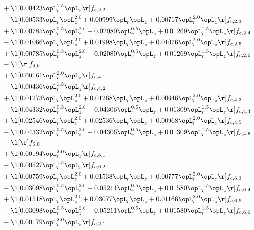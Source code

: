 \begin{alignat}{2}
& + \l[  0.00423 \opL_r^{1.5} \opL_z  \r] f_{c,2,2} \nonumber \\ 
& - \l[  0.00533 \opL_r \opL_z^{2.0} +  0.00999 \opL_r \opL_z +  0.00717 \opL_r^{2.0} \opL_z  \r] f_{c,2,3} \nonumber \\ 
& + \l[  0.00785 \opL_r^{0.5} \opL_z^{2.0} +  0.02080 \opL_r^{0.5} \opL_z +  0.01269 \opL_r^{1.5} \opL_z  \r] f_{c,2,4} \nonumber \\ 
& - \l[  0.01066 \opL_r \opL_z^{2.0} +  0.01998 \opL_r \opL_z +  0.01076 \opL_r^{2.0} \opL_z  \r] f_{c,2,5} \nonumber \\ 
& + \l[  0.00785 \opL_r^{0.5} \opL_z^{2.0} +  0.02080 \opL_r^{0.5} \opL_z +  0.01269 \opL_r^{1.5} \opL_z  \r] f_{c,2,6} \nonumber \\ 
& - \l[  \r] f_{4,0} \nonumber \\ 
& + \l[  0.00161 \opL_r^{2.0} \opL_z  \r] f_{c,4,1} \nonumber \\ 
& - \l[  0.00436 \opL_r^{1.5} \opL_z  \r] f_{c,4,2} \nonumber \\ 
& + \l[  0.01273 \opL_r \opL_z^{2.0} +  0.01268 \opL_r \opL_z +  0.00646 \opL_r^{2.0} \opL_z  \r] f_{c,4,3} \nonumber \\ 
& - \l[  0.04332 \opL_r^{0.5} \opL_z^{2.0} +  0.04306 \opL_r^{0.5} \opL_z +  0.01309 \opL_r^{1.5} \opL_z  \r] f_{c,4,4} \nonumber \\ 
& + \l[  0.02546 \opL_r \opL_z^{2.0} +  0.02536 \opL_r \opL_z +  0.00968 \opL_r^{2.0} \opL_z  \r] f_{c,4,5} \nonumber \\ 
& - \l[  0.04332 \opL_r^{0.5} \opL_z^{2.0} +  0.04306 \opL_r^{0.5} \opL_z +  0.01309 \opL_r^{1.5} \opL_z  \r] f_{c,4,6} \nonumber \\ 
& - \l[  \r] f_{6,0} \nonumber \\ 
& + \l[  0.00194 \opL_r^{2.0} \opL_z  \r] f_{c,6,1} \nonumber \\ 
& - \l[  0.00527 \opL_r^{1.5} \opL_z  \r] f_{c,6,2} \nonumber \\ 
& + \l[  0.00759 \opL_r \opL_z^{2.0} +  0.01538 \opL_r \opL_z +  0.00777 \opL_r^{2.0} \opL_z  \r] f_{c,6,3} \nonumber \\ 
& - \l[  0.03098 \opL_r^{0.5} \opL_z^{2.0} +  0.05211 \opL_r^{0.5} \opL_z +  0.01580 \opL_r^{1.5} \opL_z  \r] f_{c,6,4} \nonumber \\ 
& + \l[  0.01518 \opL_r \opL_z^{2.0} +  0.03077 \opL_r \opL_z +  0.01166 \opL_r^{2.0} \opL_z  \r] f_{c,6,5} \nonumber \\ 
& - \l[  0.03098 \opL_r^{0.5} \opL_z^{2.0} +  0.05211 \opL_r^{0.5} \opL_z +  0.01580 \opL_r^{1.5} \opL_z  \r] f_{c,6,6} \nonumber \\ 
& - \l[  0.00179 \opL_r^{2.0} \opL_z  \r] f_{c,2,1} \nonumber \\ 
\end{alignat} 



